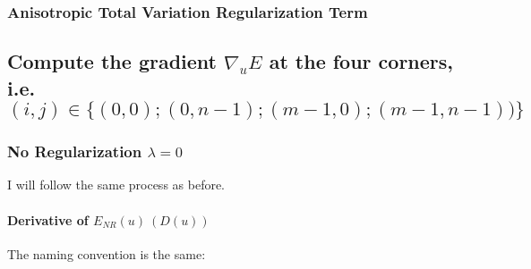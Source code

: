 \documentclass{report}
\begin{document}
			\subsubsection{Anisotropic Total Variation Regularization Term}
			\startsubsection
			\closesection
		\closesection
		
		\subsection{Compute the gradient $\nabla_u E$ at the four corners, \\ i.e. $(i,j) \in \{ (0,0); (0,n-1);(m-1,0);(m-1,n-1)) \}$}
		\startsubsection
			\subsubsection{No Regularization $\lambda = 0$}
			\startsubsection
				I will follow the same process as before.
				\vspace{-0.4cm} \paragraph{Derivative of  $E_{NR}(u) \ (D(u))$}
				\startsubsection
					\vspace{0.2cm} The naming convention is the same:
\end{document}
